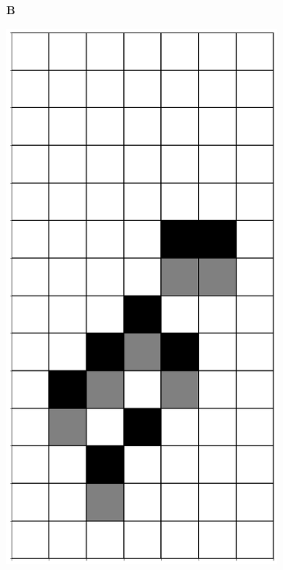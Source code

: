 \documentclass[12pt]{article}
\numberwithin{figure}{section} %
\begin{document}
\begin{figure}[H]
     	\begin{subfigure}[t]{0.03\textwidth}
    		\textbf{B}
  	\end{subfigure}	   
    	\begin{subfigure}{0.18\textwidth}
     		\centering
     		\includegraphics[width=\linewidth]{Section4/16.0}

\end{subfigure}
\end{figure}
\end{document}
